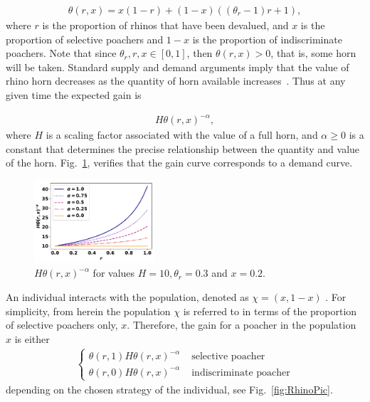 \documentclass[10pt]{article}
\begin{document}
\begin{eqnarray}
    \label{eqn:theta}
    \theta(r, x) = x (1 - r) + (1 - x) ((\theta_r - 1) r + 1),
\end{eqnarray}
where \(r\) is the proportion of rhinos that have been devalued, and \(x\) is the 
proportion of selective poachers and \(1-x\) is the proportion of indiscriminate
poachers. Note that since \(\theta_r, r, x  \in [0, 1]\), then
\(\theta(r, x) > 0\), that is, some horn will be taken. Standard supply and demand
arguments imply that the value
of rhino horn decreases as the quantity of horn available increases~\cite{mankiw2010}.
Thus at any given time the expected gain is

\begin{eqnarray}
    \label{eqn:individual_gain}
    H \theta(r, x)^{-\alpha},
\end{eqnarray}
where \(H\) is a scaling factor associated with the value of a full horn, and 
\(\alpha \geq 0\) is a constant that determines the precise relationship between
the quantity and value of the horn.  Fig.~\ref{fig:GainCurve}, verifies that the 
gain curve corresponds to a demand curve.

\begin{figure}[!htbp]
\centering
\includegraphics[width=0.4\textwidth]{images/gain_curve.pdf}
\caption{\label{fig:GainCurve} \(H \theta(r, x) ^{- \alpha}\) for values 
\(H = 10, \theta_r = 0.3\) and \(x = 0.2.\)}
\end{figure}

An individual interacts with the population, denoted as \(\chi=(x,1-x)\) .
For simplicity, from herein the population \(\chi\) is referred to in terms
of the proportion of selective poachers only, \(x\). 
Therefore, the gain for a poacher in the population \(x\) is either
\begin{eqnarray}
    \label{eqn:gain}
    \left\{
    \begin{array}{cl}
    \theta(r, 1) H \theta(r, x)^{-\alpha} & \mbox{ selective poacher}
    \\
    \theta(r, 0) H \theta(r, x)^{-\alpha} & \mbox{ indiscriminate poacher}
    \end{array} \right.
\end{eqnarray}
depending on the chosen strategy of the individual, see Fig.~\ref{fig:RhinoPic}.
\end{document}
